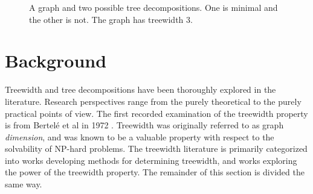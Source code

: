 \documentclass[12pt,conference]{IEEEtran}
\theoremstyle{plain}
\begin{document}
\begin{figure}
\begin{center}

\end{center}
\caption{A graph and two possible tree decompositions. One is minimal and the other is not. The graph has treewidth 3.}
\end{figure}

\section{Background}

Treewidth and tree decompositions have been thoroughly explored in the literature. Research perspectives range from the purely theoretical to the purely practical points of view. The first recorded examination of the treewidth property is from Bertel\'e et al in 1972 \cite{treewidth-original}. Treewidth was originally referred to as graph \textit{dimension}, and was known to be a valuable property with respect to the solvability of NP-hard problems. The treewidth literature is primarily categorized into works developing methods for determining treewidth, and works exploring the power of the treewidth property. The remainder of this section is divided the same way.
\end{document}
